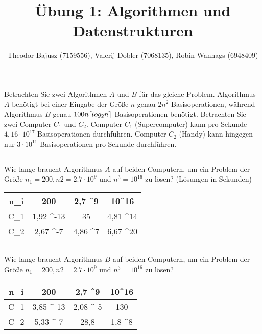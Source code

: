 \documentclass[12pt]{article}
\title{Übung 1: Algorithmen und Datenstrukturen}
\author{Theodor Bajusz (7159556), Valerij Dobler (7068135), Robin Wannags (6948409)}
\theoremstyle{remark}
\DeclarePairedDelimiter\ceil{\lceil}{\rceil}
\begin{document}
\maketitle

\section{}

Betrachten Sie zwei Algorithmen $A$ und $B$ für das gleiche Problem. Algorithmus $A$ benötigt bei einer Eingabe der Größe $n$ genau $2n^2$ Basisoperationen, während Algorithmus $B$ genau $100n \ceil{ log_2 n}$ Basisoperationen benötigt. Betrachten Sie zwei Computer $C_1$ und $C_2$. Computer $C_1$ (Supercomputer) kann pro Sekunde $4,16 \cdot 10^{17}$ Basisoperationen durchführen. Computer $C_2$ (Handy) kann hingegen nur $3 \cdot 10^{11}$ Basisoperationen pro Sekunde durchführen.

\subsection{}

Wie lange braucht Algorithmus $A$ auf beiden Computern, um ein Problem der Größe $n_1 = 200, n2 = 2.7 \cdot 10^9$ und $n^3 = 10^{16}$ zu lösen? (Lösungen in Sekunden)

\begin{center}
    \begin{tabular}{C|C|C|C}
        n_i & 200 & 2,7 ^9 & 10^{16} \\ \hline
        C_1 &  1,92 ^{-13} &  35 &  4,81 ^{14} \\ \hline
        C_2 &  2,67 ^{-7} & 4,86 ^7 &  6,67 ^{20} \\
    \end{tabular}
\end{center}


\subsection{}

Wie lange braucht Algorithmus $B$ auf beiden Computern, um ein Problem der Größe $n_1 = 200, n2 = 2.7 \cdot 10^9$ und $n^3 = 10^{16}$ zu lösen?

\begin{center}
    \begin{tabular}{C|C|C|C}
        n_i & 200 & 2,7 ^9 & 10^{16} \\ \hline
        C_1 &  3,85 ^{-13} &  2,08 ^-5  &  130 \\ \hline
        C_2 &  5,33 ^{-7} & 28,8 & 1,8 ^{8} \\
    \end{tabular}
\end{center}
\end{document}
